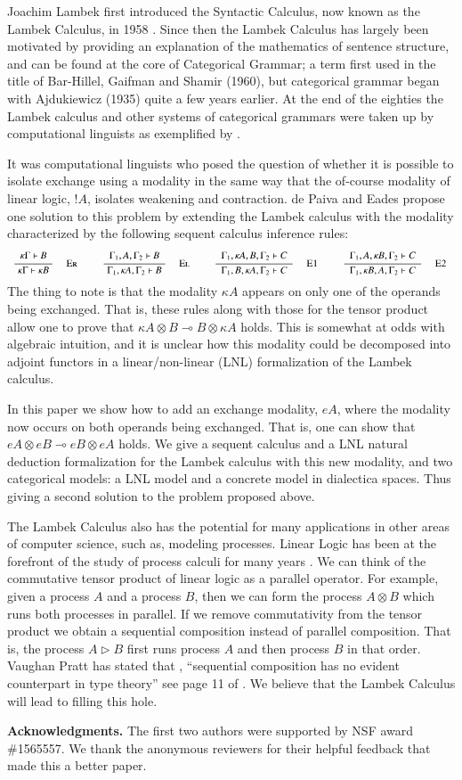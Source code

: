 Joachim Lambek first introduced the Syntactic Calculus, now known as
the Lambek Calculus, in 1958 \cite{Lambek1958}.  Since then the Lambek
Calculus has largely been motivated by providing an explanation of the
mathematics of sentence structure, and can be found at the core of
Categorical Grammar; a term first used in the title of Bar-Hillel,
Gaifman and Shamir (1960), but categorical grammar began with
Ajdukiewicz (1935) quite a few years earlier. At the end of the
eighties the Lambek calculus and other systems of categorical grammars
were taken up by computational linguists as exemplified by
\cite{oehrle2012categorial,moortgat1988categorial,Barry:1991:PFS:977180.977215,hepple1990grammar}.

It was computational linguists who posed the question of whether it is
possible to isolate exchange using a modality in the same way that the
of-course modality of linear logic, $!A$, isolates weakening and
contraction.  de Paiva and Eades \cite{dePaiva2018} propose one
solution to this problem by extending the Lambek calculus with the
modality characterized by the following sequent calculus inference
rules:
\[
\small
\begin{array}{ccccccccccccccccccccc}  
  {\displaystyle\frac{\begin{array}{l}   \kappa \Gamma \vdash \mathit{B}  \\ \end{array}}{ \kappa \Gamma \vdash \kappa \mathit{B} }\quad\textsc{ {\textsc{Er}}{} }} & & {\displaystyle\frac{\begin{array}{l}  \Gamma_{{\mathrm{1}}} , \mathit{A} , \Gamma_{{\mathrm{2}}} \vdash \mathit{B}  \\ \end{array}}{ \Gamma_{{\mathrm{1}}} , \kappa \mathit{A} , \Gamma_{{\mathrm{2}}} \vdash \mathit{B} }\quad\textsc{ {\textsc{El}}{} }} & & {\displaystyle\frac{\begin{array}{l}  \Gamma_{{\mathrm{1}}} , \kappa \mathit{A} , \mathit{B} , \Gamma_{{\mathrm{2}}} \vdash \mathit{C}  \\ \end{array}}{ \Gamma_{{\mathrm{1}}} , \mathit{B} , \kappa \mathit{A} , \Gamma_{{\mathrm{2}}} \vdash \mathit{C} }\quad\textsc{ {\textsc{E1}}{} }} & & {\displaystyle\frac{\begin{array}{l}  \Gamma_{{\mathrm{1}}} , \mathit{A} , \kappa \mathit{B} , \Gamma_{{\mathrm{2}}} \vdash \mathit{C}  \\ \end{array}}{ \Gamma_{{\mathrm{1}}} , \kappa \mathit{B} , \mathit{A} , \Gamma_{{\mathrm{2}}} \vdash \mathit{C} }\quad\textsc{ {\textsc{E2}}{} }} 
\end{array}
\]
The thing to note is that the modality $\kappa A$ appears on only one
of the operands being exchanged.  That is, these rules along with
those for the tensor product allow one to prove that $\kappa A \otimes
B \multimap B \otimes \kappa A$ holds.  This is somewhat at odds with
algebraic intuition, and it is unclear how this modality could be
decomposed into adjoint functors in a linear/non-linear (LNL)
formalization of the Lambek calculus.

In this paper we show how to add an exchange modality, $eA$, where the
modality now occurs on both operands being exchanged. That is, one can
show that $eA \otimes eB \multimap eB \otimes eA$ holds.  We give a sequent
calculus and a LNL natural deduction formalization for the Lambek calculus
with this new modality, and two categorical models: a LNL model and a
concrete model in dialectica spaces. Thus giving a second solution to the
problem proposed above.

The Lambek Calculus also has the potential for many applications in
other areas of computer science, such as, modeling processes.  Linear
Logic has been at the forefront of the study of process calculi for
many years \cite{HONDA20102223,Pratt:1997,ABRAMSKY19945}. We can think
of the commutative tensor product of linear logic as a parallel
operator.  For example, given a process $A$ and a process $B$, then we
can form the process $A \otimes B$ which runs both processes in
parallel.  If we remove commutativity from the tensor product we
obtain a sequential composition instead of parallel composition.  That
is, the process $A \rhd B$ first runs process $A$ and then process $B$
in that order.  Vaughan Pratt has stated that , ``sequential
composition has no evident counterpart in type theory'' see page 11 of
\cite{Pratt:1997}.  We believe that the Lambek Calculus will lead to
filling this hole.  

\textbf{Acknowledgments.}  The first two authors were supported by NSF
award \#1565557.  We thank the anonymous reviewers for their helpful
feedback that made this a better paper.

